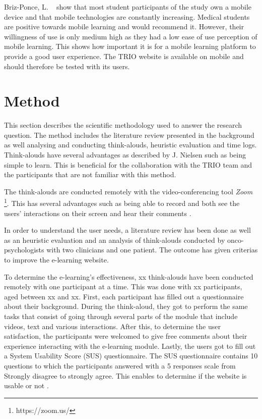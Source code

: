 \documentclass{sigchi}
\begin{document}
Briz-Ponce, L. ~\cite{Briz-Ponce2017} show that most student participants of the study own a mobile device and that mobile technologies are constantly increasing. Medical students are positive towards mobile learning and would recommend it. However, their willingness of use is only medium high as they had a low ease of use perception of mobile learning. This shows how important it is for a mobile learning platform to provide a good user experience. The TRIO website is available on mobile and should therefore be tested with its users. 


\section{Method}
This section describes the scientific methodology used to answer the research question. The method includes the literature review presented in the background as well analysing and conducting think-alouds, heuristic evaluation and time logs. Think-alouds have several advantages as described by J. Nielsen \cite{nielsen2012thinking} such as being simple to learn. This is beneficial for the collaboration with the TRIO team and the participants that are not familiar with this method. 

The think-alouds are conducted remotely with the video-conferencing tool \textit{Zoom} \footnote{https://zoom.us/}. This has several advantages such as being able to record and both see the users' interactions on their screen and hear their comments \cite{hammontree1994remote}. 

In order to understand the user needs, a literature review has been done as well as an heuristic evaluation and an analysis of think-alouds conducted by onco-psychologists with two clinicians and one patient. The outcome has given criterias to improve the e-learning website.

To determine the e-learning's effectiveness, xx think-alouds have been conducted remotely with one participant at a time. This was done with xx participants, aged between xx and xx. First, each participant has filled out a questionnaire about their background. During the think-aloud, they got to perform the same tasks that consist of going through several parts of the module that include videos, text and various interactions. After this, to determine the user satisfaction, the participants were welcomed to give free comments about their experience interacting with the e-learning module. Lastly, the users got to fill out a System Usability Score (SUS) questionnaire. The SUS questionnaire contains 10 questions to which the participants answered with a 5 responses scale from Strongly disagree to strongly agree. This enables to determine if the website is usable or not \cite{brooke1996sus}.
\end{document}
